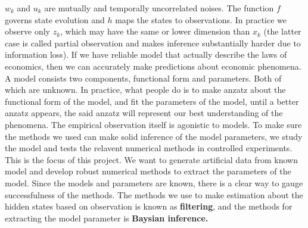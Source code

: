 \documentclass{article}
\begin{document}
$w_k$ and $u_k$ are mutually and temporally uncorrelated noises. The function $f$ governs state evolution and $h$ maps the states to observations. In practice we observe only $z_k$, which may have the same or lower dimension than $x_k$ (the latter case is called partial observation and makes inference substantially harder due to information loss). If we have reliable model that actually describe the laws of economics, then we can accurately make predictions about economic phenomena. A model consists two components, functional form and parameters. Both of which are unknown. In practice, what people do is to make anzatz about the functional form of the model, and fit the parameters of the model, until a better anzatz appears, the said anzatz will represent our best understanding of the phenomena. The empirical observation itself is agonistic to models. To make sure the methods we used can make solid inference of the model parameters, we study the model and tests the relavent numerical methods in controlled experiments. This is the focus of this project. We want to generate artificial data from known model and develop robust numerical methods to extract the parameters of the model. Since the models and parameters are known, there is a clear way to gauge successfulness of the methods. The methods we use to make estimation about the hidden states based on observation is known as \textbf{filtering}, and the methods for extracting the model parameter is \textbf{Baysian inference.}








\end{document}
